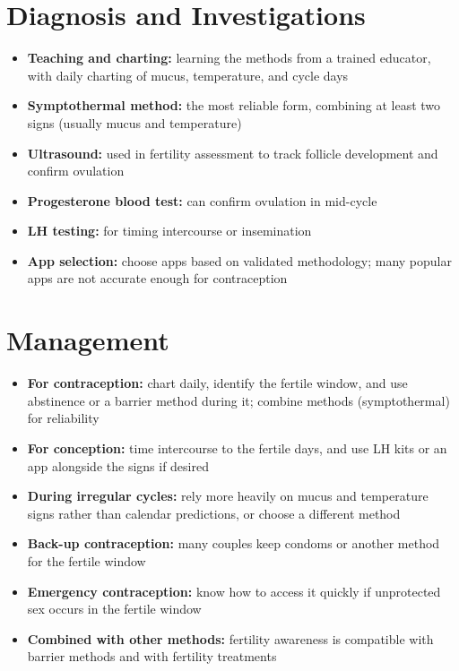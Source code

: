 \section*{Diagnosis and Investigations}
\begin{itemize}
    \item \textbf{Teaching and charting:} learning the methods from a trained educator, with daily charting of mucus, temperature, and cycle days
    \item \textbf{Symptothermal method:} the most reliable form, combining at least two signs (usually mucus and temperature)
    \item \textbf{Ultrasound:} used in fertility assessment to track follicle development and confirm ovulation
    \item \textbf{Progesterone blood test:} can confirm ovulation in mid-cycle
    \item \textbf{LH testing:} for timing intercourse or insemination
    \item \textbf{App selection:} choose apps based on validated methodology; many popular apps are not accurate enough for contraception
\end{itemize}

\section*{Management}
\begin{itemize}
    \item \textbf{For contraception:} chart daily, identify the fertile window, and use abstinence or a barrier method during it; combine methods (symptothermal) for reliability
    \item \textbf{For conception:} time intercourse to the fertile days, and use LH kits or an app alongside the signs if desired
    \item \textbf{During irregular cycles:} rely more heavily on mucus and temperature signs rather than calendar predictions, or choose a different method
    \item \textbf{Back-up contraception:} many couples keep condoms or another method for the fertile window
    \item \textbf{Emergency contraception:} know how to access it quickly if unprotected sex occurs in the fertile window
    \item \textbf{Combined with other methods:} fertility awareness is compatible with barrier methods and with fertility treatments
\end{itemize}

